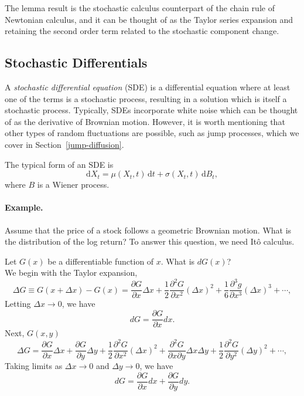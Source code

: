 The lemma result is the stochastic calculus counterpart of the chain rule of Newtonian calculus, and it can be thought of as the Taylor series expansion and retaining the second order term related to the stochastic component change.

\subsection{Stochastic Differentials}
A \emph{stochastic differential equation} (SDE) is a differential equation where at least one of the terms is a stochastic process, resulting in a solution which is itself a stochastic process. Typically, SDEs incorporate white noise which can be thought of as the derivative of Brownian motion. However, it is worth mentioning that other types of random fluctuations are possible, such as jump processes, which we cover in Section~\ref{jump-diffusion}.

The typical form of an SDE is
\begin{equation}
\mathrm{d} X_t = \mu(X_t,t)\, \mathrm{d} t +  \sigma(X_t,t)\, \mathrm{d} B_t , 
\label{eq:sde-form}
\end{equation}
where $B$ is a Wiener process.

\paragraph{Example.} Assume that the price of a stock follows a geometric Brownian motion. What is the distribution of the log return? To answer this question, we need It\^{o} calculus. 

Let $G(x)$ be a differentiable function of $x$. 
What is $dG(x)$? \\
We begin with the Taylor expansion,
\[
\Delta G \equiv G(x+\Delta x)-G(x) = \frac{\partial G}{\partial x} \Delta x 
+ \frac{1}{2} \frac{\partial^2 G}{\partial x^2} (\Delta x)^2 +\frac{1}{6}\frac{\partial^3 g}{\partial x^3}(\Delta x)^3 + \cdots,
\]
Letting $\Delta x \to 0$, we have
\[
dG = \frac{\partial G}{\partial x}dx.
\]
Next, $G(x,y)$
\[
\Delta G =\frac{\partial G}{\partial x}\Delta x + \frac{\partial G}{\partial y}\Delta y + \frac{1}{2} \frac{\partial^2 G}{\partial x^2} (\Delta x)^2
+ \frac{\partial^2 G}{\partial x \partial y} \Delta x \Delta y + \frac{1}{2} \frac{\partial^2 G}{\partial y^2} (\Delta y)^2 + \cdots,
\]
Taking limits as $\Delta x \to 0$ and $\Delta y \to 0$, we have
\[
dG = \frac{\partial G}{\partial x}dx + \frac{\partial G}{\partial y}dy.
\]

